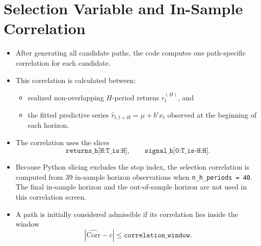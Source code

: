 \documentclass[11pt]{article}
\begin{document}
\section*{Selection Variable and In-Sample Correlation}
\begin{itemize}
\item After generating all candidate paths, the code computes one path-specific correlation for each candidate.
\item This correlation is calculated between:
\begin{itemize}
\item realized non-overlapping \(H\)-period returns \(r_t^{(H)}\), and
\item the fitted predictive series \(\hat r_{t,t+H} = \mu + b' x_t\) observed at the beginning of each horizon.
\end{itemize}
\item The correlation uses the slices
\[
\texttt{returns\_h[H:T\_is:H]}, \qquad \texttt{signal\_h[0:T\_is-H:H]}.
\]
\item Because Python slicing excludes the stop index, the selection correlation is computed from 39 in-sample horizon observations when \texttt{n\_h\_periods = 40}. The final in-sample horizon and the out-of-sample horizon are not used in this correlation screen.
\item A path is initially considered admissible if its correlation lies inside the window
\[
| \widehat{\mathrm{Corr}} - c | \leq \texttt{correlation\_window}.
\]
\end{itemize}
\end{document}
